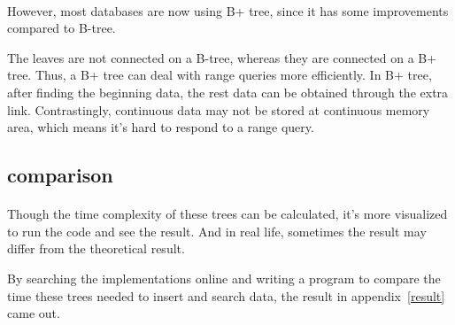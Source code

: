\documentclass{article}
\begin{document}
\paragraph{}
However, most databases are now using B+ tree, since it has some improvements compared to B-tree.

The leaves are not connected on a B-tree, whereas they are connected on a B+ tree. Thus, a B+ tree can deal with range queries more efficiently. In B+ tree, after finding the beginning data, the rest data can be obtained through the extra link. Contrastingly, continuous data may not be stored at continuous memory area, which means it's hard to respond to a range query.


\newpage


\subsection{comparison}

\paragraph{}
Though the time complexity of these trees can be calculated, it's more visualized to run the code and see the result. And in real life, sometimes the result may differ from the theoretical result.

By searching the implementations online and writing a program to compare the time these trees needed to insert and search data, the result in appendix~\ref{result} came out.
\end{document}
